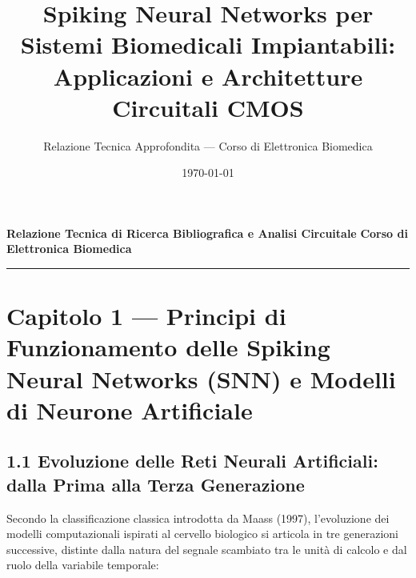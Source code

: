 \documentclass[11pt,a4paper]{article}
\title{\textbf{\Large Spiking Neural Networks per Sistemi Biomedicali Impiantabili:\\Applicazioni e Architetture Circuitali CMOS}}
\author{Relazione Tecnica Approfondita --- Corso di Elettronica Biomedica}
\date{\today}
\begin{document}
\maketitle
\tableofcontents
\newpage


\textbf{Relazione Tecnica di Ricerca Bibliografica e Analisi Circuitale}
\textbf{Corso di Elettronica Biomedica}

\bigskip\hrule\bigskip

\section{Capitolo 1 --- Principi di Funzionamento delle Spiking Neural Networks (SNN) e Modelli di Neurone Artificiale}

\subsection{1.1 Evoluzione delle Reti Neurali Artificiali: dalla Prima alla Terza Generazione}

Secondo la classificazione classica introdotta da Maass (1997), l'evoluzione dei modelli computazionali ispirati al cervello biologico si articola in tre generazioni successive, distinte dalla natura del segnale scambiato tra le unità di calcolo e dal ruolo della variabile temporale:
\end{document}

